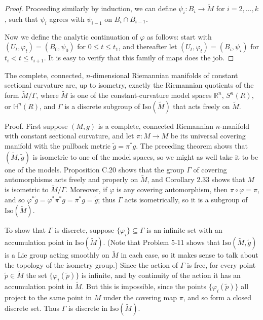 \begin{theorem}
\begin{proof}
Proceeding similarly by induction, we can define $\psi_i : B_i \to \tilde{M}$ for $i = 2, \ldots, k$, such that $\psi_i$ agrees with $\psi_{i-1}$ on $B_i \cap B_{i-1}$.

Now we define the analytic continuation of $\varphi$ as follows: start with $(U_t, \varphi_t) = (B_0, \psi_0)$ for $0 \leq t \leq t_1$, and thereafter let $(U_t, \varphi_t) = (B_i, \psi_i)$ for $t_i < t \leq t_{i+1}$. It is easy to verify that this family of maps does the job.
\end{proof}
\end{theorem}

\begin{corollary}
\label{cor:characterization-constant-curvature}

The complete, connected, $n$-dimensional Riemannian manifolds of constant sectional curvature are, up to isometry, exactly the Riemannian quotients of the form $\tilde{M}/\Gamma$, where $\tilde{M}$ is one of the constant-curvature model spaces $\mathbb{R}^n$, $S^n(R)$, or $\mathbb{H}^n(R)$, and $\Gamma$ is a discrete subgroup of $\text{Iso}(\tilde{M})$ that acts freely on $\tilde{M}$.

Proof. First suppose $(M, g)$ is a complete, connected Riemannian $n$-manifold with constant sectional curvature, and let $\pi : M \to M$ be its universal covering manifold with the pullback metric $\tilde{g} = \pi^* g$. The preceding theorem shows that $(\tilde{M}, \tilde{g})$ is isometric to one of the model spaces, so we might as well take it to be one of the models. Proposition C.20 shows that the group $\Gamma$ of covering automorphisms acts freely and properly on $\tilde{M}$, and Corollary 2.33 shows that $M$ is isometric to $\tilde{M}/\Gamma$. Moreover, if $\varphi$ is any covering automorphism, then $\pi \circ \varphi = \pi$, and so $\varphi^*\tilde{g} = \varphi^* \pi^* g = \pi^* g = \tilde{g}$; thus $\Gamma$ acts isometrically, so it is a subgroup of $\text{Iso}(\tilde{M})$.

To show that $\Gamma$ is discrete, suppose $\{\varphi_i\} \subseteq \Gamma$ is an infinite set with an accumulation point in $\text{Iso}(\tilde{M})$. (Note that Problem 5-11 shows that $\text{Iso}(\tilde{M}, \tilde{g})$ is a Lie group acting smoothly on $\tilde{M}$ in each case, so it makes sense to talk about the topology of the isometry group.) Since the action of $\Gamma$ is free, for every point $\tilde{p} \in \tilde{M}$ the set $\{\varphi_i(\tilde{p})\}$ is infinite, and by continuity of the action it has an accumulation point in $\tilde{M}$. But this is impossible, since the points $\{\varphi_i(\tilde{p})\}$ all project to the same point in $M$ under the covering map $\pi$, and so form a closed discrete set. Thus $\Gamma$ is discrete in $\text{Iso}(\tilde{M})$.


\end{corollary}
